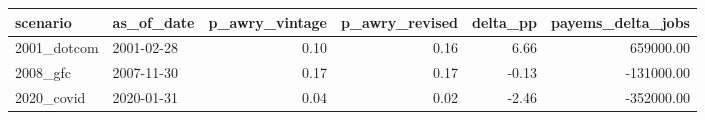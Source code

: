 \begin{tabular}{llrrrr}
\toprule
scenario & as_of_date & p_awry_vintage & p_awry_revised & delta_pp & payems_delta_jobs \\
\midrule
2001_dotcom & 2001-02-28 & 0.10 & 0.16 & 6.66 & 659000.00 \\
2008_gfc & 2007-11-30 & 0.17 & 0.17 & -0.13 & -131000.00 \\
2020_covid & 2020-01-31 & 0.04 & 0.02 & -2.46 & -352000.00 \\
\bottomrule
\end{tabular}

